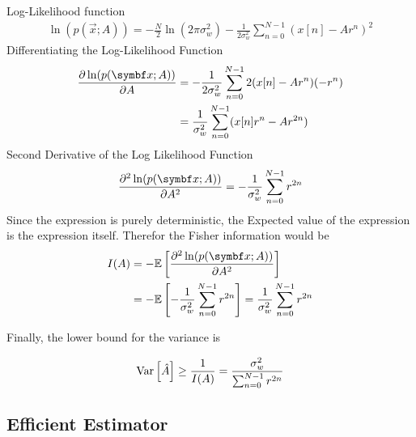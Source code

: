 Log-Likelihood function
\begin{align}
    \ln(p(\vec{x};A)) = -\frac{N}{2}\ln(2\pi \sigma^2_w) -\frac{1}{2\sigma_w^2}\sum_{n=0}^{N-1} (x[n] - Ar^n)^2 \label{eq:log-likelihood-A}
\end{align}
Differentiating the Log-Likelihood Function
\begin{align}
    \pd[\ln(p(\vec{x};A))]{A}
    &= -\frac{1}{2\sigma_w^2}\sum_{n=0}^{N-1} 2(x[n] - Ar^n) (-r^n)\notag \\
    &= \frac{1}{\sigma_w^2}\sum_{n=0}^{N-1} (x[n]r^n - Ar^{2n})\label{eq:derivative-lnp}
\end{align}
Second Derivative of the Log Likelihood Function
\begin{equation}
    \pnd[\ln(p(\vec{x};A))]{2}{A} = -\frac{1}{\sigma_w^2}\sum_{n=0}^{N-1} r^{2n}
\end{equation}
Since the expression is purely deterministic, the Expected value of the expression is the expression itself. Therefor the Fisher information would be
\begin{align}
    I(A) &= -\E{\pnd[\ln(p(\vec{x};A))]{2}{A}}\notag \\
    &= -\E{-\frac{1}{\sigma_w^2}\sum_{n=0}^{N-1} r^{2n}} = \frac{1}{\sigma_w^2}\sum_{n=0}^{N-1} r^{2n}\label{eq:fisher-information-A}
\end{align}

Finally, the lower bound for the variance is
\begin{boxed-block}
\begin{equation}
    \mathrm{Var}\left[\hat A\right] \geq \frac{1}{I(A)} = \frac{\sigma_w^2}{\sum_{n=0}^{N-1}r^{2n}}
\end{equation}
\end{boxed-block}

\subsection{Efficient Estimator}

